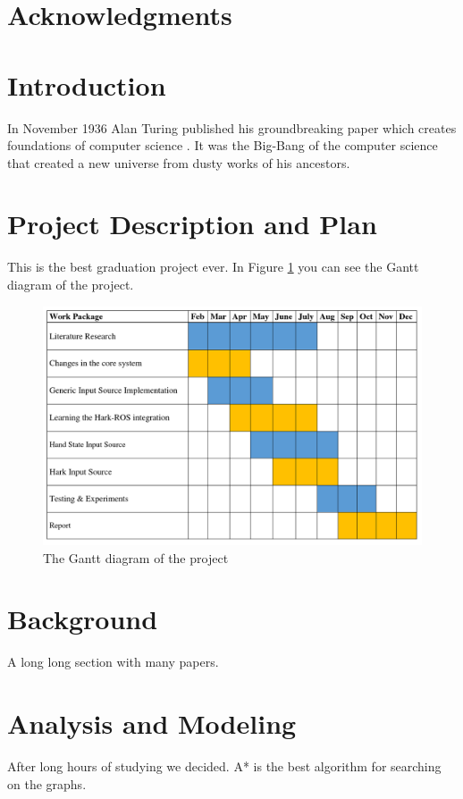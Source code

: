 \documentclass[a4paper, 12pt, titlepage]{article}
\begin{document}
\newpage
\section*{Acknowledgments}
\newpage
\tableofcontents
\newpage

\section{Introduction}
In November 1936 Alan Turing published his groundbreaking paper which creates foundations of computer science \cite{turing1937computability}. It was the Big-Bang of the computer science that created a new universe from dusty works of his ancestors.
\newpage
\section{Project Description and Plan}
This is the best graduation project ever. In Figure \ref{fig:ganttdiagram} you can see the Gantt diagram of the project.

\begin{figure}[H]
    \centering
    \includegraphics[width=\linewidth]{gantt_diagram}
    \caption{The Gantt diagram of the project}
    \label{fig:ganttdiagram}
\end{figure}

\newpage
\section{Background}
A long long section with many papers.

\newpage
\section{Analysis and Modeling}
After long hours of studying we decided. A* is the best algorithm for searching on the graphs.
\end{document}
